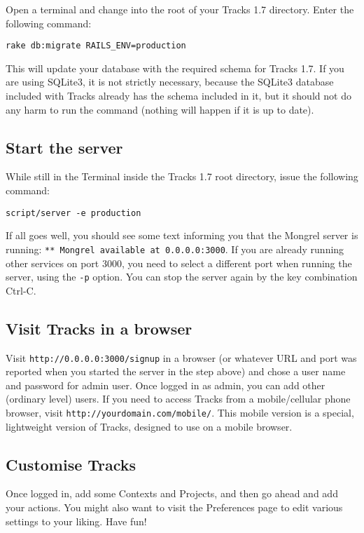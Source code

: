 \documentclass[10pt,twoside]{memoir}
\begin{document}
Open a terminal and change into the root of your Tracks 1.7 directory. Enter the following command:


\texttt{rake db:migrate RAILS\_ENV=production}


This will update your database with the required schema for Tracks 1.7. If you are using SQLite3, it is not strictly necessary, because the SQLite3 database included with Tracks already has the schema included in it, but it should not do any harm to run the command (nothing will happen if it is up to date).


\subsection{Start the server}
\label{startserver_install}

While still in the Terminal inside the Tracks 1.7 root directory, issue the following command:


\texttt{script/server -e production}


If all goes well, you should see some text informing you that the Mongrel server is running: \texttt{** Mongrel available at 0.0.0.0:3000}. If you are already running other services on port 3000, you need to select a different port when running the server, using the \texttt{-p} option. You can stop the server again by the key combination Ctrl-C.


\subsection{Visit Tracks in a browser}
\label{signup_install}

Visit \texttt{http://0.0.0.0:3000/signup} in a browser (or whatever URL and port was reported when you started the server in the step above) and chose a user name and password for admin user. Once logged in as admin, you can add other (ordinary level) users. If you need to access Tracks from a mobile/cellular phone browser, visit \texttt{http://yourdomain.com/mobile/}. This mobile version is a special, lightweight version of Tracks, designed to use on a mobile browser.


\subsection{Customise Tracks}
\label{customise_install}

Once logged in, add some Contexts and Projects, and then go ahead and add your actions. You might also want to visit the Preferences page to edit various settings to your liking. Have fun!
\end{document}
